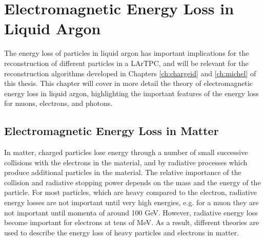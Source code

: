 \chapter{\label{ch:energyloss}Electromagnetic Energy Loss in Liquid Argon} 

% 

\minitoc

The energy loss of particles in liquid argon has important implications for the
reconstruction of different particles in a LArTPC, and will be relevant for the
reconstruction algorithms developed in Chapters \ref{ch:chargeid} and 
\ref{ch:michel} of  this thesis. This chapter will cover in more detail the 
theory of electromagnetic energy loss in liquid argon, highlighting the 
important features of the energy loss for muons, electrons, and photons.

\section{Electromagnetic Energy Loss in Matter}
In matter, charged particles lose energy through a number of small successive
collisions with the electrons in the material, and by radiative processes which
produce additional particles in the material. The relative importance of the
collision and radiative stopping power depends on the mass and the energy of the
particle. For most particles, which are heavy compared to the electron, 
radiative energy losses are not important until very high energies, e.g. for a 
muon they are not important until momenta of around 100 GeV. However, radiative 
energy loss become important for electrons at tens of 
MeV\cite{PhysRevD.98.030001}. As a result, different theories are used to 
describe the energy loss of heavy particles and electrons in matter.

